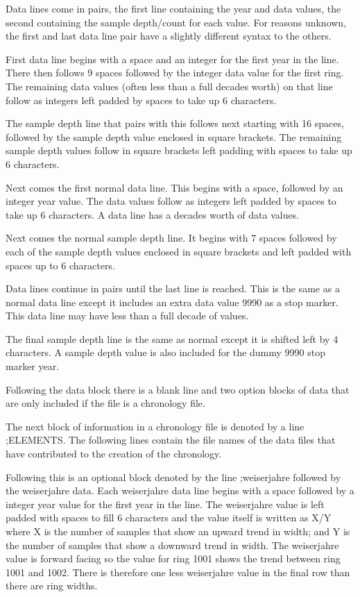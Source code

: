 Data lines come in pairs, the first line containing the year and data values, the second containing the sample depth/count for each value. For reasons unknown, the first and last data line pair have a slightly different syntax to the others. 

\begin{itemize*}
 \item First data line begins with a space and an integer for the first year in the line. There then follows 9 spaces followed by the integer data value for the first ring. The remaining data values (often less than a full decades worth) on that line follow as integers left padded by spaces to take up 6 characters.
\item  The sample depth line that pairs with this follows next starting with 16 spaces, followed by the sample depth value enclosed in square brackets. The remaining sample depth values follow in square brackets left padding with spaces to take up 6 characters.
\item  Next comes the first normal data line. This begins with a space, followed by an integer year value. The data values follow as integers left padded by spaces to take up 6 characters. A data line has a decades worth of data values.
\item  Next comes the normal sample depth line. It begins with 7 spaces followed by each of the sample depth values enclosed in square brackets and left padded with spaces up to 6 characters.
\item  Data lines continue in pairs until the last line is reached. This is the same as a normal data line except it includes an extra data value 9990 as a stop marker. This data line may have less than a full decade of values.
\item  The final sample depth line is the same as normal except it is shifted left by 4 characters. A sample depth value is also included for the dummy 9990 stop marker year. 
\end{itemize*}

Following the data block there is a blank line and two option blocks of data that are only included if the file is a chronology file.

The next block of information in a chronology file is denoted by a line ;ELEMENTS. The following lines contain the file names of the data files that have contributed to the creation of the chronology.

Following this is an optional block denoted by the line ;weiserjahre followed by the weiserjahre data. Each weiserjahre data line begins with a space followed by a integer year value for the first year in the line. The weiserjahre value is left padded with spaces to fill 6 characters and the value itself is written as X/Y where X is the number of samples that show an upward trend in width; and Y is the number of samples that show a downward trend in width. The weiserjahre value is forward facing so the value for ring 1001 shows the trend between ring 1001 and 1002. There is therefore one less weiserjahre value in the final row than there are ring widths.

